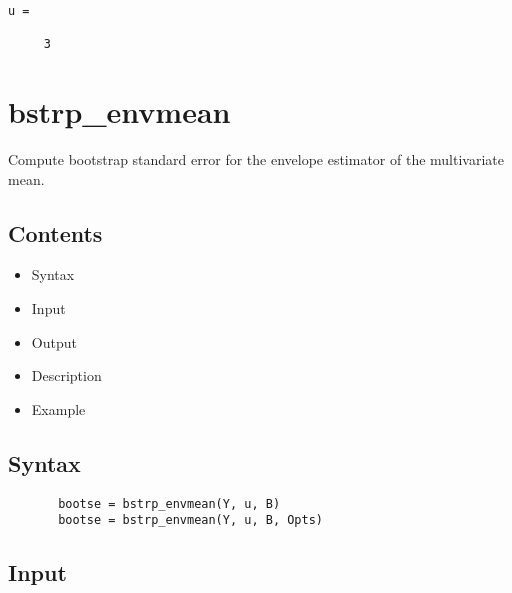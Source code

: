 \documentclass[a4paper,11pt,openany]{memoir}
\begin{document}
        \color{lightgray} \begin{verbatim}
u =

     3

\end{verbatim} \color{black}
    
    \newpage

\rmfamily
\color{black}\section{bstrp\_envmean}

\begin{par}
Compute bootstrap standard error for the envelope estimator of the multivariate mean.
\end{par} \vspace{1em}

\subsection*{Contents}

\begin{itemize}
\setlength{\itemsep}{-1ex}
   \item Syntax
   \item Input
   \item Output
   \item Description
   \item Example
\end{itemize}


\subsection*{Syntax}


\begin{verbatim}       bootse = bstrp_envmean(Y, u, B)
       bootse = bstrp_envmean(Y, u, B, Opts)\end{verbatim}
    

\subsection*{Input}
\end{document}
